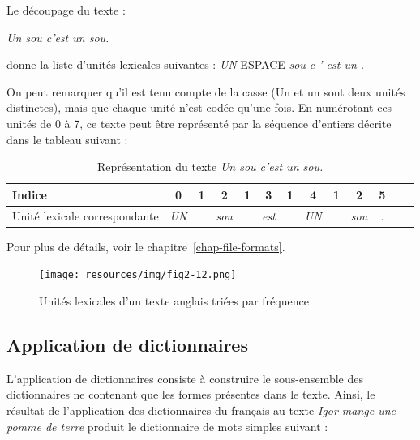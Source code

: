 \bigskip
\noindent Le découpage du texte :

\bigskip
\textit{Un sou c’est un sou.}

\bigskip
\noindent donne la liste d’unités lexicales suivantes :  \textit{UN} ESPACE \textit{sou c ’ est un
.}

\bigskip
\noindent On peut remarquer qu’il est tenu compte de la casse (Un et un sont deux unités distinctes), mais que chaque unité n’est codée qu’une fois. En numérotant ces unités de 0 à 7,
ce texte peut être représenté par la séquence d’entiers décrite dans le tableau suivant :

\bigskip
\begin{table}[!ht]
\begin{center}
\begin{tabular}{|p{2.8cm}||c|c|c|c|c|c|c|c|c|c|c|c|}
\hline
Indice             & 0 & 1 & 2 & 1 & 3 & 1 & 4 & 1 & 2 & 5
\\
\hline
Unité lexicale correspondante & \textit{UN} &   & \textit{sou} &   & \textit{est} &  & \textit{UN}
& & \textit{sou} & \textit{.}
\\
\hline
\end{tabular}
\caption{Représentation du texte \textit{Un sou c’est un sou.}}
\end{center}
\end{table}

\bigskip
\noindent Pour plus de détails, voir le chapitre~\ref{chap-file-formats}.

\begin{figure}[!ht]
\begin{center}
\texttt{[image: resources/img/fig2-12.png]}
\caption{Unités lexicales d’un texte anglais triées par fréquence}
\end{center}
\end{figure}



\subsection{Application de dictionnaires}
\label{text-applying-dictionaries}
L’application de dictionnaires consiste à construire le sous-ensemble des dictionnaires
ne contenant que les formes présentes dans le texte. Ainsi, le résultat de l’application des
dictionnaires du français au texte \textit{Igor mange une pomme de terre} produit le dictionnaire de
mots simples suivant :


